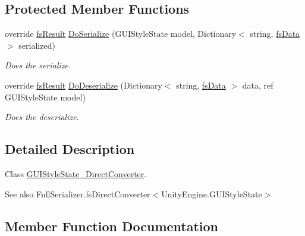 \subsection*{Protected Member Functions}
\begin{DoxyCompactItemize}
\item 
override \hyperlink{struct_full_serializer_1_1fs_result}{fs\+Result} \hyperlink{class_full_serializer_1_1_internal_1_1_direct_converters_1_1_g_u_i_style_state___direct_converter_a22918e9d8716303f0d7c311ded59182a}{Do\+Serialize} (G\+U\+I\+Style\+State model, Dictionary$<$ string, \hyperlink{class_full_serializer_1_1fs_data}{fs\+Data} $>$ serialized)
\begin{DoxyCompactList}\small\item\em Does the serialize. \end{DoxyCompactList}\item 
override \hyperlink{struct_full_serializer_1_1fs_result}{fs\+Result} \hyperlink{class_full_serializer_1_1_internal_1_1_direct_converters_1_1_g_u_i_style_state___direct_converter_a566d302ecb008a55fab674178d8a52bb}{Do\+Deserialize} (Dictionary$<$ string, \hyperlink{class_full_serializer_1_1fs_data}{fs\+Data} $>$ data, ref G\+U\+I\+Style\+State model)
\begin{DoxyCompactList}\small\item\em Does the deserialize. \end{DoxyCompactList}\end{DoxyCompactItemize}


\subsection{Detailed Description}
Class \hyperlink{class_full_serializer_1_1_internal_1_1_direct_converters_1_1_g_u_i_style_state___direct_converter}{G\+U\+I\+Style\+State\+\_\+\+Direct\+Converter}. 

\begin{DoxySeeAlso}{See also}
Full\+Serializer.\+fs\+Direct\+Converter$<$\+Unity\+Engine.\+G\+U\+I\+Style\+State$>$


\end{DoxySeeAlso}


\subsection{Member Function Documentation}
\mbox{\label{class_full_serializer_1_1_internal_1_1_direct_converters_1_1_g_u_i_style_state___direct_converter_a11870a07fd7aade8717b1764137d9dbb}} 
